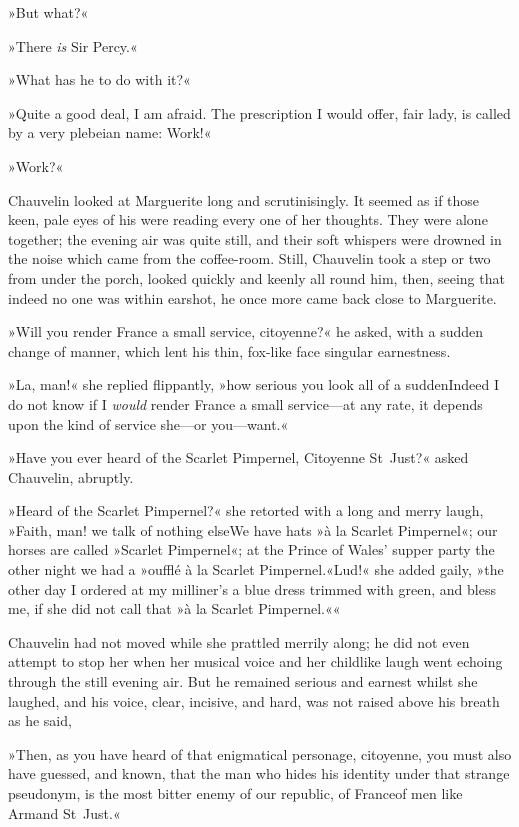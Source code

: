 »But what?«

»There \textit{is} Sir Percy.«

»What has he to do with it?«

»Quite a good deal, I am afraid. The prescription I would offer, fair lady, is called by a very plebeian name: Work!«

»Work?«

Chauvelin looked at Marguerite long and scrutinisingly. It seemed as if those keen, pale eyes of his were reading every one of her thoughts. They were alone together; the evening air was quite still, and their soft whispers were drowned in the noise which came from the coffee-room. Still, Chauvelin took a step or two from under the porch, looked quickly and keenly all round him, then, seeing that indeed no one was within earshot, he once more came back close to Marguerite.

»Will you render France a small service, citoyenne?« he asked, with a sudden change of manner, which lent his thin, fox-like face singular earnestness.

»La, man!« she replied flippantly, »how serious you look all of a sudden\textellipsis \allowbreak  Indeed I do not know if I \textit{would} render France a small service—at any rate, it depends upon the kind of service she—or you—want.«

»Have you ever heard of the Scarlet Pimpernel, Citoyenne St~Just?« asked Chauvelin, abruptly.

»Heard of the Scarlet Pimpernel?« she retorted with a long and merry laugh, »Faith, man! we talk of nothing else\textellipsis \allowbreak  We have hats »à la Scarlet Pimpernel«; our horses are called »Scarlet Pimpernel«; at the Prince of Wales' supper party the other night we had a »oufflé à la Scarlet Pimpernel.«\textellipsis \allowbreak  Lud!« she added gaily, »the other day I ordered at my milliner's a blue dress trimmed with green, and bless me, if she did not call that »à la Scarlet Pimpernel.««

Chauvelin had not moved while she prattled merrily along; he did not even attempt to stop her when her musical voice and her childlike laugh went echoing through the still evening air. But he remained serious and earnest whilst she laughed, and his voice, clear, incisive, and hard, was not raised above his breath as he said,\longdash


»Then, as you have heard of that enigmatical personage, citoyenne, you must also have guessed, and known, that the man who hides his identity under that strange pseudonym, is the most bitter enemy of our republic, of France\textellipsis \allowbreak  of men like Armand St~Just.«

